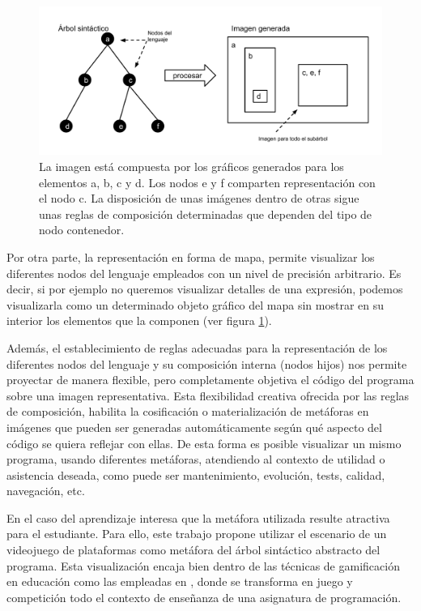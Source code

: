 \documentclass{llncs}
\begin{document}
\begin{figure}[ht]
\begin{center}
\includegraphics[scale=0.5]{images/arbol-mapa.pdf}
\caption{La imagen está compuesta por los gráficos generados para los elementos a, b, c y d. Los nodos e y f comparten representación con el nodo c. La disposición de unas imágenes dentro de otras sigue unas reglas de composición determinadas que dependen del tipo de nodo contenedor.
\label{fig:arbolmapa}}
\end{center}
\end{figure}

Por otra parte, la representación en forma de mapa, permite visualizar los diferentes nodos del lenguaje empleados con un nivel de precisión arbitrario. Es decir, si por ejemplo no queremos visualizar detalles de una expresión, podemos visualizarla como un determinado objeto gráfico del mapa sin mostrar en su interior los elementos que la componen (ver figura \ref{fig:arbolmapa}).

Además, el establecimiento de reglas adecuadas para la representación de los diferentes nodos del lenguaje y su composición interna (nodos hijos) nos permite proyectar de manera flexible, pero completamente objetiva el código del programa sobre una imagen representativa. Esta flexibilidad creativa ofrecida por las reglas de composición, habilita la cosificación o materialización de metáforas \cite{travers1996programming} en imágenes que pueden ser generadas automáticamente según qué aspecto del código se quiera reflejar con ellas. De esta forma es posible visualizar un mismo programa, usando diferentes metáforas, atendiendo al contexto de utilidad o asistencia deseada, como puede ser mantenimiento, evolución, tests, calidad, navegación, etc.

En el caso del aprendizaje interesa que la metáfora utilizada resulte atractiva para el estudiante. Para ello, este trabajo propone utilizar el escenario de un videojuego de plataformas como metáfora del árbol sintáctico abstracto del programa. Esta visualización encaja bien dentro de las técnicas de gamificación en educación como las empleadas en \cite{kumar2012gamification}, donde se transforma en juego y competición todo el contexto de enseñanza de una asignatura de programación. 
\end{document}
